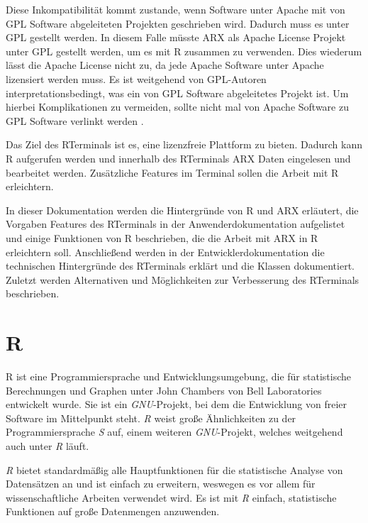 \documentclass[a4paper, 12pt]{report} %
\begin{document}
Diese Inkompatibilität kommt zustande, wenn Software unter Apache mit von GPL Software abgeleiteten Projekten geschrieben wird. Dadurch muss es unter GPL gestellt werden. In diesem Falle müsste ARX als Apache License Projekt unter GPL gestellt werden, um es mit R zusammen zu verwenden. Dies wiederum lässt die Apache License nicht zu, da jede Apache Software unter Apache lizensiert werden muss. Es ist weitgehend von GPL-Autoren interpretationsbedingt, was ein von GPL Software abgeleitetes Projekt ist. Um hierbei Komplikationen zu vermeiden, sollte nicht mal von Apache Software zu GPL Software verlinkt werden \cite{license}. 

Das Ziel des RTerminals ist es, eine lizenzfreie Plattform zu bieten. Dadurch kann R aufgerufen werden und innerhalb des RTerminals ARX Daten eingelesen und bearbeitet werden. Zusätzliche Features im Terminal sollen die Arbeit mit R erleichtern. 

In dieser Dokumentation werden die Hintergründe von R und ARX erläutert, die Vorgaben Features des RTerminals in der Anwenderdokumentation aufgelistet und einige Funktionen von R beschrieben, die die Arbeit mit ARX in R erleichtern soll. Anschließend werden in der Entwicklerdokumentation die technischen Hintergründe des RTerminals erklärt und die Klassen dokumentiert. Zuletzt werden Alternativen und Möglichkeiten zur Verbesserung des RTerminals beschrieben. 


\section*{R}\label{r}
R ist eine Programmiersprache und Entwicklungsumgebung, die für statistische Berechnungen und Graphen unter John Chambers von Bell Laboratories entwickelt wurde. Sie ist ein \textit{GNU}-Projekt, bei dem die Entwicklung von freier Software im Mittelpunkt steht. \textit{R} weist große Ähnlichkeiten zu der Programmiersprache \textit{S} auf, einem weiteren \textit{GNU}-Projekt, welches weitgehend auch unter \textit{R} läuft. \cite{rproject}

\textit{R} bietet standardmäßig alle Hauptfunktionen für die statistische Analyse von Datensätzen an und ist einfach zu erweitern, weswegen es vor allem für wissenschaftliche Arbeiten verwendet wird. Es ist mit \textit{R} einfach, statistische Funktionen auf große Datenmengen anzuwenden. \cite{rproject}


\end{document}
